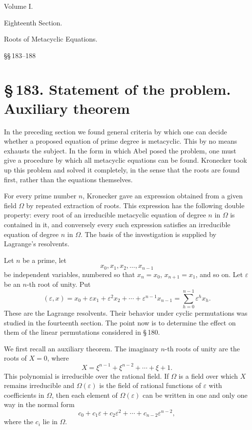 \documentclass[11pt]{article}
\newcommand{\sect}[2]{\section*{\S\,#1. #2}}
\newcommand{\eps}{\varepsilon}
\newcommand{\Om}{\Omega}
\begin{document}
\begin{center}
{\large Volume I.}\par
{\Large Eighteenth Section.}\par\medskip
{\Large Roots of Metacyclic Equations.}\par\medskip
{\large \S\S\,183--188}
\end{center}

\sect{183}{Statement of the problem. Auxiliary theorem}

In the preceding section we found general criteria by which one can decide whether a proposed equation of prime degree is metacyclic. This by no means exhausts the subject. In the form in which Abel posed the problem, one must give a procedure by which all metacyclic equations can be found. Kronecker took up this problem and solved it completely, in the sense that the roots are found first, rather than the equations themselves.

For every prime number $n$, Kronecker gave an expression obtained from a given field $\Om$ by repeated extraction of roots. This expression has the following double property: every root of an irreducible metacyclic equation of degree $n$ in $\Om$ is contained in it, and conversely every such expression satisfies an irreducible equation of degree $n$ in $\Om$. The basis of the investigation is supplied by Lagrange's resolvents.

Let $n$ be a prime, let
\[
  x_0,x_1,x_2,\ldots,x_{n-1}
\]
be independent variables, numbered so that $x_n=x_0$, $x_{n+1}=x_1$, and so on. Let $\eps$ be an $n$-th root of unity. Put
\begin{equation}
  (\eps,x)=x_0+\eps x_1+\eps^2x_2+\cdots+\eps^{n-1}x_{n-1}
  =\sum_{h=0}^{n-1}\eps^h x_h .
\end{equation}
These are the Lagrange resolvents. Their behavior under cyclic permutations was studied in the fourteenth section. The point now is to determine the effect on them of the linear permutations considered in \S\,180.

We first recall an auxiliary theorem. The imaginary $n$-th roots of unity are the roots of $X=0$, where
\begin{equation}
  X=\xi^{n-1}+\xi^{n-2}+\cdots+\xi+1.
\end{equation}
This polynomial is irreducible over the rational field. If $\Om$ is a field over which $X$ remains irreducible and $\Om(\eps)$ is the field of rational functions of $\eps$ with coefficients in $\Om$, then each element of $\Om(\eps)$ can be written in one and only one way in the normal form
\begin{equation}
  c_0+c_1\eps+c_2\eps^2+\cdots+c_{n-2}\eps^{n-2},
\end{equation}
where the $c_i$ lie in $\Om$.
\end{document}
